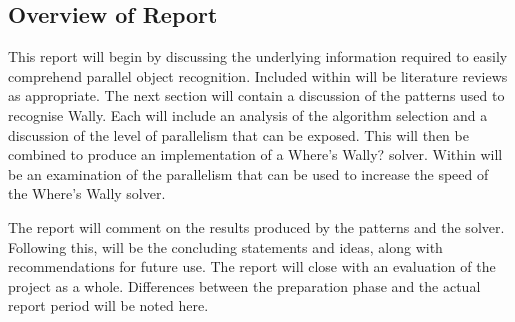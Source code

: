\documentclass[../main.tex]{subfiles}
\begin{document}
    \subsection{Overview of Report}
    This report will begin by discussing the underlying information required to easily comprehend parallel object recognition.
    Included within will be literature reviews as appropriate.
    The next section will contain a discussion of the patterns used to recognise Wally.
    Each will include an analysis of the algorithm selection and a discussion of the level of parallelism that can be exposed.
    This will then be combined to produce an implementation of a Where's Wally? solver.
    Within will be an examination of the parallelism that can be used to increase the speed of the Where's Wally solver.
    
    The report will comment on the results produced by the patterns and the solver.
    Following this, will be the concluding statements and ideas, along with recommendations for future use.
    The report will close with an evaluation of the project as a whole.
    Differences between the preparation phase and the actual report period will be noted here.
    \biblio
\end{document}
